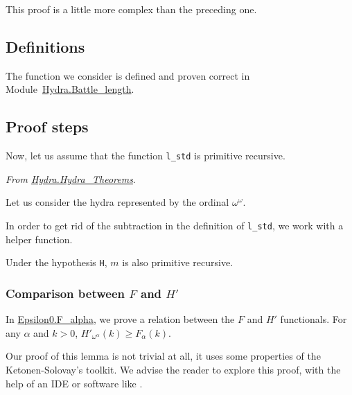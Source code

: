 This proof is  a little more complex than the preceding one.

\subsection{Definitions}

The function we consider is defined and proven correct in
Module~\href{../theories/html/hydras.Hydra.Battle_length.html}{Hydra.Battle\_length}.



\subsection{Proof steps}

Now, let us assume that the function \texttt{l\_std} is primitive recursive.


\emph{From \href{../theories/html/hydras.Hydra.Hydra_Theorems.html}{Hydra.Hydra\_Theorems}}.



Let us consider the hydra represented by the ordinal $\omega^\omega$.




In order to get rid of the subtraction in the definition of \texttt{l\_std}, we work with a helper function.



Under the hypothesis \texttt{H}, $m$ is also primitive recursive.




\subsubsection{Comparison between $F$ and $H'$}

In \href{../theories/html/hydras.Epsilon0.F_alpha.html}{Epsilon0.F\_alpha}, we prove a relation between the $F$ and $H'$ functionals. For any $\alpha$ and $k>0$,
$H'_{\omega^\alpha}(k)\geq F_\alpha(k)$.




Our proof of this lemma is not trivial at all, it uses some properties of the Ketonen-Solovay's toolkit. We advise the reader to explore this proof, with the help of an IDE or software like \alectr.

